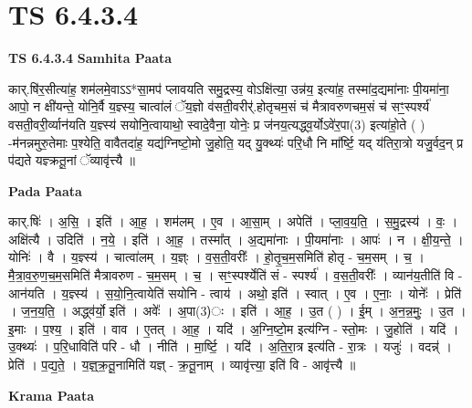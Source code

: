 \documentclass[17pt]{extarticle}
\begin{document}
\section{ TS 6.4.3.4 }

\textbf{TS 6.4.3.4 } \newline
\textbf{Samhita Paata} \newline

कार्.षि॑र॒सीत्या॑ह॒ शम॑लमे॒वाऽऽ*सा॒मप॑ प्लावयति समु॒द्रस्य॒ वोऽक्षि॑त्या॒ उन्न॑य॒ इत्या॑ह॒ तस्मा॑द॒द्यमा॑नाः पी॒यमा॑ना॒ आपो॒ न क्षी॑यन्ते॒ योनि॒र्वै य॒ज्ञ्स्य॒ चात्वा॑लं ॅय॒ज्ञो व॑सती॒वरीर्॑.होतृचम॒सं च॑ मैत्रावरुणचम॒सं च॑ सꣳ॒॒स्पर्श्य॑ वसती॒वरी॒र्व्यान॑यति य॒ज्ञ्स्य॑ सयोनि॒त्वायाथो॒ स्वादे॒वैना॒ योनेः॒ प्र ज॑नय॒त्यद्ध्व॒र्योऽवे॑र॒पा(3) इत्या॑हो॒ते ( ) -म॑नन्नमुरु॒तेमाः प॒श्येति॒ वावैतदा॑ह॒ यद्य॑ग्निष्टो॒मो जु॒होति॒ यद् यु॒क्थ्यः॑ परि॒धौ नि मा᳚र्ष्टि॒ यद् य॑तिरा॒त्रो यजु॒र्वद॒न् प्र प॑द्यते यज्ञ्क्रतू॒नां ॅव्यावृ॑त्त्यै ॥ \newline

\textbf{Pada Paata} \newline

कार्.षिः॑ । अ॒सि॒ । इति॑ । आ॒ह॒ । शम॑लम् । ए॒व । आ॒सा॒म् । अपेति॑ । प्ला॒व॒य॒ति॒ । स॒मु॒द्रस्य॑ । वः॒ । अक्षि॑त्यै । उदिति॑ । न॒ये॒ । इति॑ । आ॒ह॒ । तस्मा᳚त् । अ॒द्यमा॑नाः । पी॒यमा॑नाः । आपः॑ । न । क्षी॒य॒न्ते॒ । योनिः॑ । वै । य॒ज्ञ्स्य॑ । चात्वा॑लम् । य॒ज्ञ्ः । व॒स॒ती॒वरीः᳚ । हो॒तृ॒च॒म॒समिति॑ होतृ - च॒म॒सम् । च॒ । मै॒त्रा॒व॒रु॒ण॒च॒म॒समिति॑ मैत्रावरुण - च॒म॒सम् । च॒ । सꣳ॒॒स्पर्श्येति॑ सं - स्पर्श्य॑ । व॒स॒ती॒वरीः᳚ । व्यान॑य॒तीति॑ वि - आन॑यति । य॒ज्ञ्स्य॑ । स॒यो॒नि॒त्वायेति॑ सयोनि - त्वाय॑ । अथो॒ इति॑ । स्वात् । ए॒व । ए॒नाः॒ । योनेः᳚ । प्रेति॑ । ज॒न॒य॒ति॒ । अद्ध्व॑र्यो॒ इति॑ । अवेः᳚ । अ॒पा(3)ः । इति॑ । आ॒ह॒ । उ॒त ( ) । ई॒म् । अ॒न॒न्न॒मुः॒ । उ॒त । इ॒माः । प॒श्य॒ । इति॑ । वाव । ए॒तत् । आ॒ह॒ । यदि॑ । अ॒ग्नि॒ष्टो॒म इत्य॑ग्नि - स्तो॒मः । जु॒होति॑ । यदि॑ । उ॒क्थ्यः॑ । प॒रि॒धाविति॑ परि - धौ । नीति॑ । मा॒र्ष्टि॒ । यदि॑ । अ॒ति॒रा॒त्र इत्य॑ति - रा॒त्रः । यजुः॑ । वदन्न्॑ । प्रेति॑ । प॒द्य॒ते॒ । य॒ज्ञ्॒क्र॒तू॒नामिति॑ यज्ञ् - क्र॒तू॒नाम् । व्यावृ॑त्त्या॒ इति॑ वि - आवृ॑त्त्यै ॥  \newline


\textbf{Krama Paata} \newline
\end{document}
